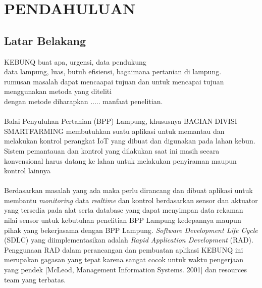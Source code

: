 \chapter{PENDAHULUAN}

\vspace{4.5pt}

\begin{flushleft}
    \section{Latar Belakang} 

\begin{justify}
  \noindent 
  
  KEBUNQ buat apa, urgensi, data pendukung\\
  data lampung, luas, butuh efisiensi, bagaimana pertanian di lampung.\\
  rumusan masalah dapat mencaapai tujuan dan untuk mencapai tujuan menggunakan metoda yang diteliti\\
  dengan metode diharapkan ..... manfaat penelitian.
  \\
  \\
  Balai Penyuluhan Pertanian (BPP) Lampung, khususnya BAGIAN DIVISI SMARTFARMING membutuhkan suatu aplikasi untuk memantau dan melakukan kontrol
  perangkat IoT yang dibuat dan digunakan pada lahan kebun. Sistem pemantauan dan kontrol yang dilakukan saat ini
  masih secara konvensional harus datang ke lahan untuk melakukan penyiraman maupun kontrol lainnya
  \\
  \\
  Berdasarkan masalah yang ada maka perlu dirancang dan dibuat aplikasi untuk membantu
\textit{monitoring} data \textit{realtime} dan kontrol berdasarkan sensor dan aktuator yang tersedia pada alat serta database yang dapat menyimpan data rekaman nilai sensor untuk kebutuhan
penelitian BPP Lampung kedepannya maupun pihak yang bekerjasama dengan BPP Lampung. \textit{Software Development Life Cycle} (SDLC) yang diimplementasikan adalah
\textit{Rapid Application Development} (RAD). Penggunaan RAD dalam perancangan dan pembuatan aplikasi KEBUNQ ini merupakan gagasan yang tepat karena sangat cocok untuk 
waktu pengerjaan yang pendek [McLeod, Management Information Systems. 2001] dan resources team yang terbatas.

\end{justify}
\vspace{1cm}   


\end{flushleft}
